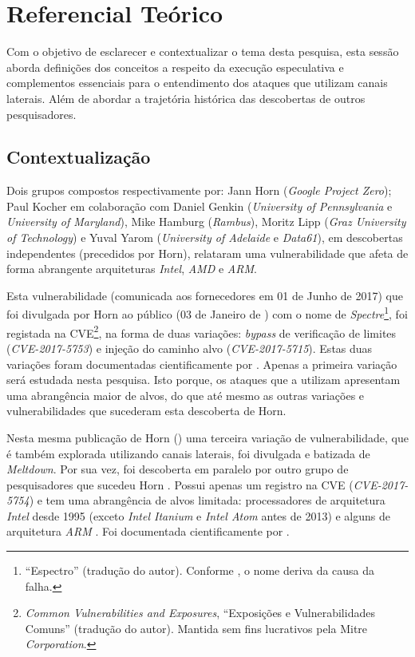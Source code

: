 \documentclass[
	article,			    %
	12pt,				    %
	oneside,			    %
	a4paper,			    %
	chapter=TITLE,		    %
	section=TITLE,		    %
	subsection=TITLE,	    %
	english,			    %
	brazil,				    %
	sumario=tradicional
]{abntex2}
\begin{document}
\section{Referencial Teórico}
Com o objetivo de esclarecer e contextualizar o tema desta pesquisa, esta sessão aborda definições dos conceitos a respeito da execução especulativa e complementos essenciais para o entendimento dos ataques que utilizam canais laterais. Além de abordar a trajetória histórica das descobertas de outros pesquisadores.

\subsection{Contextualização}
Dois grupos compostos respectivamente por: Jann Horn (\emph{Google Project Zero}); Paul Kocher em colaboração com Daniel Genkin (\emph{University of Pennsylvania} e \emph{University of Maryland}), Mike Hamburg (\emph{Rambus}), Moritz Lipp (\emph{Graz University of Technology}) e Yuval Yarom (\emph{University of Adelaide} e \emph{Data61}), em descobertas independentes (precedidos por Horn), relataram uma vulnerabilidade que afeta de forma abrangente arquiteturas \emph{Intel}, \emph{AMD} e \emph{ARM}.

Esta vulnerabilidade (comunicada aos fornecedores em 01 de Junho de 2017) que foi divulgada por Horn ao público (03 de Janeiro de \citeyear{Jann2018Reading}) com o nome de \emph{Spectre}\footnote{``Espectro'' (tradução do autor). Conforme , o nome deriva da causa da falha.}, foi registada na CVE\footnote{\emph{Common Vulnerabilities and Exposures}, ``Exposições e Vulnerabilidades Comuns'' (tradução do autor). Mantida sem fins lucrativos pela Mitre \emph{Corporation}.}, na forma de duas variações: \emph{bypass} de verificação de limites (\emph{CVE-2017-5753}) e injeção do caminho alvo (\emph{CVE-2017-5715}). Estas duas variações foram documentadas cientificamente por . Apenas a primeira variação será estudada nesta pesquisa. Isto porque, os ataques que a utilizam apresentam uma abrangência maior de alvos, do que até mesmo as outras variações e vulnerabilidades que sucederam esta descoberta de Horn.

Nesta mesma publicação de Horn (\citeyear{Jann2018Reading}) uma terceira variação de vulnerabilidade, que é também explorada utilizando canais laterais, foi divulgada e batizada de \emph{Meltdown}. Por sua vez, foi descoberta em paralelo por outro grupo de pesquisadores que sucedeu Horn \cite{Graz2018Meltdown}. Possui apenas um registro na CVE (\emph{CVE-2017-5754}) e tem uma abrangência de alvos limitada: processadores de arquitetura \emph{Intel} desde 1995 (exceto \emph{Intel Itanium} e \emph{Intel Atom} antes de 2013) e alguns de arquitetura \emph{ARM} \cite{Graz2018Meltdown}. Foi documentada cientificamente por .
\end{document}
